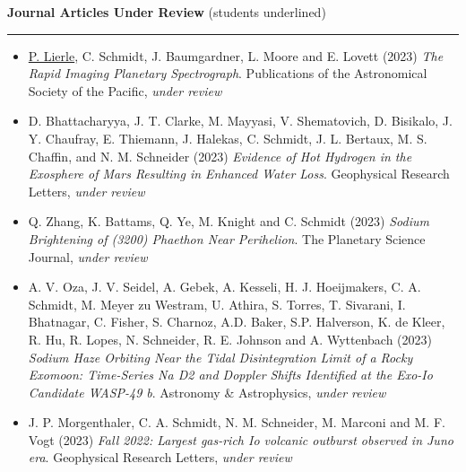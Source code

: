 \documentclass[12pt]{report}
\begin{document}
\vspace{2 mm}
\noindent\textbf{Journal Articles Under Review} (students underlined) \rm\hspace*{\fill} \\
\rule{\textwidth}{1pt}
\begin{itemize} \itemsep -2pt %
  \item \underline{P. Lierle}, C. Schmidt, J. Baumgardner, L. Moore and E. Lovett (2023) \textit{The Rapid Imaging Planetary Spectrograph}. Publications of the Astronomical Society of the Pacific, \textit{under review}
  \item D. Bhattacharyya, J. T. Clarke, M. Mayyasi, V. Shematovich, D. Bisikalo, J. Y. Chaufray, E. Thiemann, J. Halekas, C. Schmidt, J. L. Bertaux, M. S. Chaffin, and N. M. Schneider (2023) \textit{Evidence of Hot Hydrogen in the Exosphere of Mars Resulting in Enhanced Water Loss}. Geophysical Research Letters, \textit{under review}
  \item Q. Zhang, K. Battams, Q. Ye, M. Knight and C. Schmidt (2023) \textit{Sodium Brightening of (3200) Phaethon Near Perihelion}. The Planetary Science Journal, \textit{under review}
  \item A. V. Oza, J. V. Seidel, A. Gebek, A. Kesseli, H. J. Hoeijmakers, C. A. Schmidt, M. Meyer zu Westram, U. Athira, S. Torres, T. Sivarani, I. Bhatnagar, C. Fisher, S. Charnoz, A.D. Baker, S.P. Halverson, K. de Kleer, R. Hu, R. Lopes, N. Schneider, R. E. Johnson and A. Wyttenbach (2023) \textit{Sodium Haze Orbiting Near the Tidal Disintegration Limit of a Rocky Exomoon: Time-Series Na D2 and Doppler Shifts Identified at the Exo-Io Candidate WASP-49 b}. Astronomy \& Astrophysics, \textit{under review}
  \item J. P. Morgenthaler, C. A. Schmidt, N. M. Schneider, M. Marconi and M. F. Vogt (2023) \textit{Fall 2022: Largest gas-rich Io volcanic outburst observed in Juno era}. Geophysical Research Letters, \textit{under review}
 \end{itemize}
\vspace{2 mm}
\end{document}

